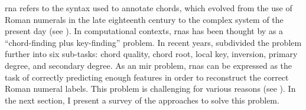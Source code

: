 

\gls{rna} refers to the syntax used to annotate chords,
which evolved from the use of Roman numerals in the late
eighteenth century to the complex system of the present day
(see ). In
computational contexts, \glspl{rna} has been thought by
\textcite{temperley1997algorithm} as a ``chord-finding plus
key-finding'' problem. In recent years,
\textcite{chen2018functional} subdivided the problem further
into six sub-tasks: chord quality, chord root, local key,
inversion, primary degree, and secondary degree. As an
\gls{mir} problem, \glspl{rna} can be expressed as the task
of correctly predicting enough features in order to
reconstruct the correct Roman numeral labels. This problem
is challenging for various reasons (see
). In the next section, I present a
survey of the approaches to solve this problem.
